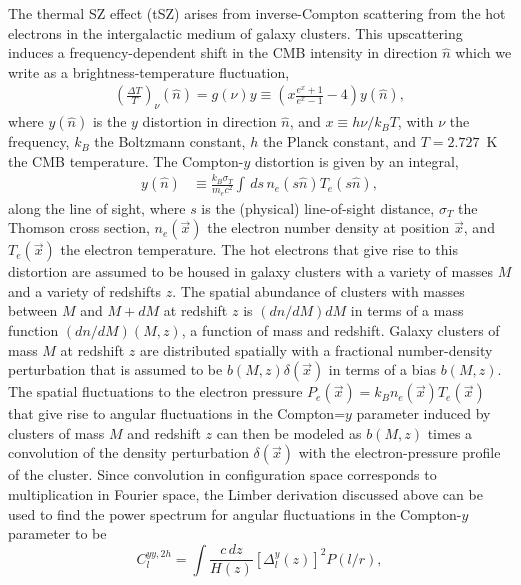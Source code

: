 \documentclass[aps,twocolumn,floats,prd,nofootinbib]{revtex4-1}
\begin{document}
The thermal SZ effect (tSZ) arises from inverse-Compton
scattering from the hot electrons in the intergalactic medium of
galaxy clusters. This upscattering induces a frequency-dependent
shift in the CMB intensity in direction $\hat n$ which we write
as a brightness-temperature fluctuation,
\begin{align}
     \left(\frac{\Delta T}{T}\right)_\nu(\hat{n}) = g(\nu) y \equiv
     \left(x\frac{e^x + 1}{e^x - 1} - 4\right)y(\hat{n}),
\end{align}
where $y(\hat n)$ is the $y$ distortion in direction $\hat n$,
and $x \equiv h\nu/k_B T$, with $\nu$ the frequency, $k_B$ the
Boltzmann constant, $h$ the Planck constant, and $T=2.727$~K the
CMB temperature.  The Compton-$y$ distortion is given by an integral,
\begin{align}
     y(\hat{n}) &\equiv \frac{k_B\sigma_T}{m_e
     c^2}\int\,  ds \, n_e(s \hat n) T_e
     (s \hat n),
\label{eqn:yparameter}
\end{align}
along the line of sight, where $s$ is the (physical) line-of-sight
distance, $\sigma_T$ the Thomson cross section, $n_e(\vec x)$ the
electron number density at position $\vec x$, and $T_e(\vec x)$
the electron temperature.  The hot electrons that give rise to
this distortion are assumed to be housed in galaxy clusters
with a variety of masses $M$ and a variety of redshifts $z$.
The spatial abundance of clusters with masses between $M$ and
$M+dM$ at redshift $z$ is $(dn/dM)dM$ in terms of a mass
function $(dn/dM)(M,z)$, a function of mass and redshift.
Galaxy clusters of mass $M$ at redshift $z$ are distributed
spatially with a fractional number-density perturbation that is
assumed to be $b(M,z)\delta(\vec x)$ in terms of a bias
$b(M,z)$.  The spatial fluctuations to the electron pressure
$P_e(\vec x)=k_B n_e(\vec x) T_e(\vec x)$ that give rise to
angular fluctuations in the Compton=$y$ parameter induced by
clusters of mass $M$ and redshift $z$ can then be
modeled as $b(M,z)$ times a convolution of the density
perturbation $\delta(\vec x)$ with the electron-pressure profile
of the cluster.  Since convolution in configuration space
corresponds to multiplication in Fourier space, the Limber
derivation discussed above can be used to find the power
spectrum for angular fluctuations in the Compton-$y$ parameter
to be \cite{Komatsu:1999ev,Diego:2004uw,Taburet:2010hb,Ade:2013qta,Ade:2015mva}
\begin{equation}
     C_l^{yy,2h} = \int \frac{c\, dz}{H(z)} \left[
     \Delta^{y}_l(z) \right]^2
     P(l/r),
\label{eqn:Cly2h}
\end{equation}
\end{document}
